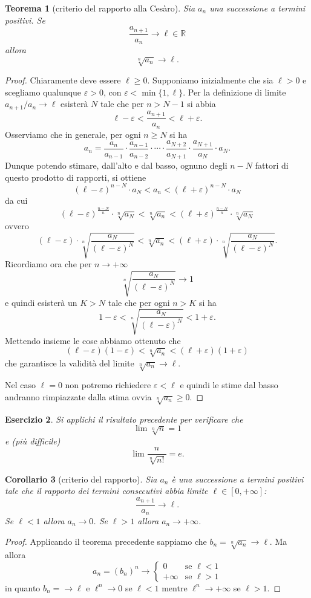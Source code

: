 \documentclass[italian,a4paper,oneside,headinclude]{scrbook}
\newcommand{\eps}{\varepsilon}
\newcommand{\RR}{\mathbb R}
\newcommand{\enclose}[1]{{\left( #1 \right)}}
\newtheorem{theorem}{Teorema}
\newtheorem{exercise}[theorem]{Esercizio}
\newtheorem{corollary}[theorem]{Corollario}
\begin{document}
\begin{theorem}[criterio del rapporto alla Cesàro]
Sia $a_n$ una successione a termini positivi.
Se
\[
  \frac{a_{n+1}}{a_n} \to \ell \in \RR
\]
allora
\[
 \sqrt[n]{a_n}\to \ell.
\]
\end{theorem}
%
\begin{proof}
Chiaramente deve essere $\ell\ge 0$. Supponiamo inizialmente
che sia $\ell>0$ e scegliamo qualunque $\eps>0$, con $\eps < \min\{1,\ell\}$.
Per la definizione di limite $a_{n+1}/a_n \to \ell$ esisterà $N$ tale che per $n>N-1$ si abbia
\[
  \ell -\eps < \frac{a_{n+1}}{a_n} < \ell + \eps.
\]
Osserviamo che in generale, per ogni $n\ge N$ si ha
\[
 a_n  = \frac{a_n}{a_{n-1}}\cdot\frac{a_{n-1}}{a_{n-2}}
 \cdot\cdots\cdot
     \frac{a_{N+2}}{a_{N+1}}\cdot\frac{a_{N+1}}{a_N}
     \cdot a_N.
\]
Dunque potendo stimare,
dall'alto e dal basso,
ognuno degli $n-N$ fattori di questo
prodotto di rapporti, si ottiene
\[
(\ell -\eps)^{n-N} \cdot a_N < a_n < (\ell +\eps)^{n-N} \cdot a_N
\]
da cui
\[
(\ell -\eps)^{\frac{n-N}{n}} \cdot \sqrt[n]{a_N}
< \sqrt[n]{a_n}
< (\ell +\eps)^{\frac{n-N}{n}} \cdot \sqrt[n]{a_N}
\]
ovvero
\[
(\ell -\eps) \cdot \sqrt[n]{\frac{a_N}{(\ell -\eps)^N}}
< \sqrt[n]{a_n}
< (\ell +\eps) \cdot \sqrt[n]{\frac{a_N}{(\ell -\eps)^N}}.
\]
Ricordiamo ora che per $n\to +\infty$
\[
\sqrt[n]{\frac{a_N}{(\ell -\eps)^N}} \to 1
\]
e quindi esisterà un $K>N$ tale che per ogni $n>K$ si ha
\[
 1-\eps < \sqrt[n]{\frac{a_N}{(\ell -\eps)^N}} < 1+\eps.
\]
Mettendo insieme le cose abbiamo ottenuto che
\[
 (\ell - \eps)(1-\eps)
 < \sqrt[n]{a_n}
 < (\ell + \eps)(1+\eps)
 \]
che garantisce la validità del limite $\sqrt[n]{a_n}\to \ell$.

Nel caso $\ell = 0$
non potremo richiedere $\eps < \ell$
e quindi le stime dal basso andranno rimpiazzate
dalla stima ovvia
$\sqrt[n]{a_n}\ge 0$.
\end{proof}

\begin{exercise}
Si applichi il risultato precedente per
verificare che
\[
   \lim \sqrt[n]{n} = 1
\]
e (più difficile)
\[
  \lim \frac{n}{\sqrt[n]{n!}} = e.
\]
\end{exercise}

\begin{corollary}[criterio del rapporto]
Sia $a_n$ è una successione a termini positivi tale che
il rapporto dei termini consecutivi abbia limite $\ell\in [0,+\infty]$:
\[
  \frac{a_{n+1}}{a_n} \to \ell.
\]
Se $\ell < 1$ allora $a_n \to 0$. Se $\ell>1$ allora $a_n \to +\infty$.

\end{corollary}
%
\begin{proof}
Applicando il teorema precedente sappiamo che $b_n = \sqrt[n]{a_n}\to \ell$. Ma allora
\[
  a_n = \enclose{b_n}^n \to
  \begin{cases}
    0 & \text{se $\ell < 1$}\\
    +\infty & \text{se $\ell > 1$}
  \end{cases}
\]
in quanto $b_n = \to \ell$ e $\ell^n \to 0$ se $\ell<1$ mentre $\ell^n \to +\infty$
se $\ell>1$.
\end{proof}
\end{document}
